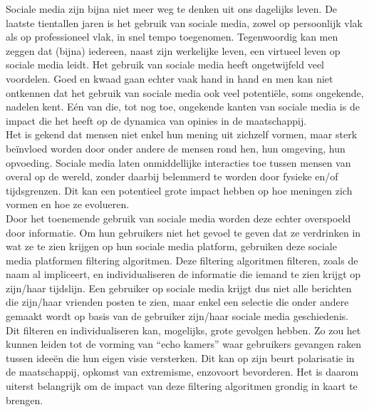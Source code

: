 \documentclass[11 pt , letterpaper , twoside , openright]{book}
\newenvironment{abstract}%
{\cleardoublepage\null \vfill\begin{center}\bfseries \abstractname \end{center}}{\vfill\null}
\begin{document}

\begin{abstract}
\thispagestyle{plain}
\setcounter{page}{\value{abstractpage}}

\noindent
Sociale media zijn bijna niet meer weg te denken uit ons dagelijks leven. De laatste tientallen jaren is het gebruik van sociale media, zowel op persoonlijk vlak als op professioneel vlak, in snel tempo toegenomen. Tegenwoordig kan men zeggen dat (bijna) iedereen, naast zijn werkelijke leven, een virtueel leven op sociale media leidt. Het gebruik van sociale media heeft ongetwijfeld veel voordelen. Goed en kwaad gaan echter vaak hand in hand en men kan niet ontkennen dat het gebruik van sociale media ook veel potentiële, soms ongekende, nadelen kent. Eén van die, tot nog toe, ongekende kanten van sociale media is de impact die het heeft op de dynamica van opinies in de maatschappij. \\
\newline
Het is gekend dat mensen niet enkel hun mening uit zichzelf vormen, maar sterk beïnvloed worden door onder andere de mensen rond hen, hun omgeving, hun opvoeding. Sociale media laten onmiddellijke interacties toe tussen mensen van overal op de wereld, zonder daarbij belemmerd te worden door fysieke en/of tijdsgrenzen. Dit kan een potentieel grote impact hebben op hoe meningen zich vormen en hoe ze evolueren.\\
\newline
Door het toenemende gebruik van sociale media worden deze echter overspoeld door informatie. Om hun gebruikers niet het gevoel te geven dat ze verdrinken in wat ze te zien krijgen op hun sociale media platform, gebruiken deze sociale media platformen filtering algoritmen. Deze filtering algoritmen filteren, zoals de naam al impliceert, en individualiseren de informatie die iemand te zien krijgt op zijn/haar tijdslijn. Een gebruiker op sociale media krijgt dus niet alle berichten die zijn/haar vrienden posten te zien, maar enkel een selectie die onder andere gemaakt wordt op basis van de gebruiker zijn/haar sociale media geschiedenis. Dit filteren en individualiseren kan, mogelijks, grote gevolgen hebben. Zo zou het kunnen leiden tot de vorming van ``echo kamers'' waar gebruikers gevangen raken tussen ideeën die hun eigen visie versterken. Dit kan op zijn beurt polarisatie in de maatschappij, opkomst van extremisme, enzovoort bevorderen. Het is daarom uiterst belangrijk om de impact van deze filtering algoritmen grondig in kaart te brengen.\\

\end{abstract}
\end{document}
